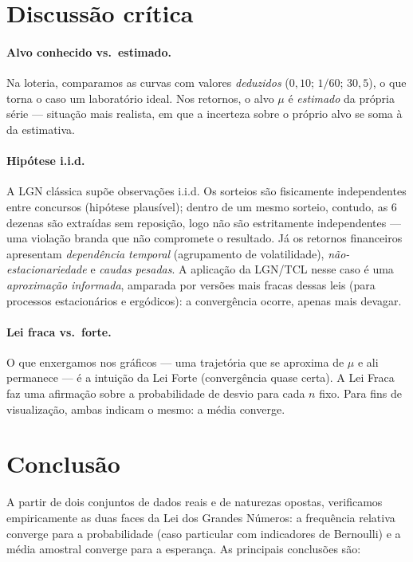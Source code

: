 \documentclass[12pt,a4paper]{article}
\begin{document}
\section{Discussão crítica}

\paragraph{Alvo conhecido vs.\ estimado.} Na loteria, comparamos as curvas com valores
\emph{deduzidos} ($0{,}10$; $1/60$; $30{,}5$), o que torna o caso um laboratório ideal.
Nos retornos, o alvo $\mu$ é \emph{estimado} da própria série --- situação mais
realista, em que a incerteza sobre o próprio alvo se soma à da estimativa.

\paragraph{Hipótese i.i.d.} A LGN clássica supõe observações i.i.d. Os sorteios são
fisicamente independentes entre concursos (hipótese plausível); dentro de um mesmo
sorteio, contudo, as 6 dezenas são extraídas sem reposição, logo não são estritamente
independentes --- uma violação branda que não compromete o resultado. Já os retornos
financeiros apresentam \emph{dependência temporal} (agrupamento de volatilidade),
\emph{não-estacionariedade} e \emph{caudas pesadas}. A aplicação da LGN/TCL nesse caso é
uma \emph{aproximação informada}, amparada por versões mais fracas dessas leis (para
processos estacionários e ergódicos): a convergência ocorre, apenas mais devagar.

\paragraph{Lei fraca vs.\ forte.} O que enxergamos nos gráficos --- uma trajetória que
se aproxima de $\mu$ e ali permanece --- é a intuição da Lei Forte (convergência quase
certa). A Lei Fraca faz uma afirmação sobre a probabilidade de desvio para cada $n$
fixo. Para fins de visualização, ambas indicam o mesmo: a média converge.

\section{Conclusão}

A partir de dois conjuntos de dados reais e de naturezas opostas, verificamos
empiricamente as duas faces da Lei dos Grandes Números: a frequência relativa converge
para a probabilidade (caso particular com indicadores de Bernoulli) e a média amostral
converge para a esperança. As principais conclusões são:
\end{document}
